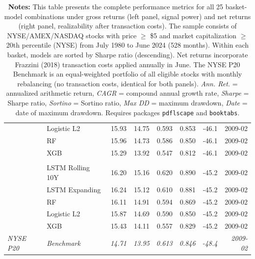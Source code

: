 \begin{landscape}
\begin{table}[htbp]
\begin{minipage}[t]{0.47\linewidth}
{\begin{tabular}{l l r r r r r r}
 & Logistic L2 & 15.93 & 14.75 & 0.593 & 0.853 & -46.1 & 2009-02 \\
 & RF & 15.96 & 14.73 & 0.586 & 0.850 & -46.1 & 2009-02 \\
 & XGB & 15.29 & 13.92 & 0.547 & 0.812 & -46.1 & 2009-02 \\
\addlinespace[0.15cm]
\multicolumn{8}{l}{\textit{\textbf{Kalman $\beta$}}} \\
 & LSTM Rolling 10Y & 16.20 & 15.16 & 0.620 & 0.890 & -45.2 & 2009-02 \\
 & LSTM Expanding & 16.24 & 15.12 & 0.610 & 0.881 & -45.2 & 2009-02 \\
 & RF & 16.11 & 14.91 & 0.594 & 0.869 & -45.2 & 2009-02 \\
 & Logistic L2 & 15.87 & 14.69 & 0.590 & 0.850 & -45.2 & 2009-02 \\
 & XGB & 15.43 & 14.11 & 0.557 & 0.829 & -45.2 & 2009-02 \\
\addlinespace[0.15cm]
\midrule
\textit{NYSE P20} & \textit{Benchmark} & \textit{14.71} & \textit{13.95} & \textit{0.613} & \textit{0.846} & \textit{-48.4} & \textit{2009-02} \\
\bottomrule
\end{tabular}}
\end{minipage}


\vspace{0.3cm}
\caption*{\textbf{Notes:} This table presents the complete performance metrics for all 25 basket-model combinations under gross returns (left panel, signal power) and net returns (right panel, realizability after transaction costs). The sample consists of NYSE/AMEX/NASDAQ stocks with price $\geq$ \$5 and market capitalization $\geq$ 20th percentile (NYSE) from July 1980 to June 2024 (528 months). Within each basket, models are sorted by Sharpe ratio (descending). Net returns incorporate Frazzini (2018) transaction costs applied annually in June. The NYSE P20 Benchmark is an equal-weighted portfolio of all eligible stocks with monthly rebalancing (no transaction costs, identical for both panels). \textit{Ann. Ret.} = annualized arithmetic return, \textit{CAGR} = compound annual growth rate, \textit{Sharpe} = Sharpe ratio, \textit{Sortino} = Sortino ratio, \textit{Max DD} = maximum drawdown, \textit{Date} = date of maximum drawdown. Requires packages \texttt{pdflscape} and \texttt{booktabs}.}
\end{table}
\end{landscape}
